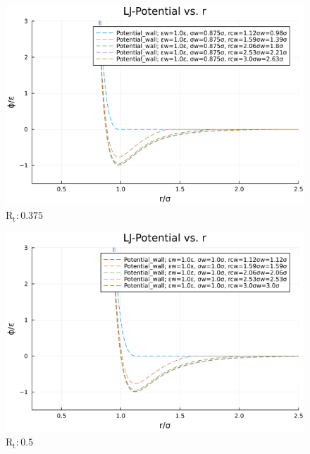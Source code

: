 \begin{figure}[H]
  \centering
  \includegraphics[scale=0.5]{image/RaRtmap_LJ/LJ-Potential_Rt0.375.png}
  \caption{$\text{R}_\text{t}:0.375$}
  \label{}
\end{figure}

\begin{figure}[H]
  \centering
  \includegraphics[scale=0.5]{image/RaRtmap_LJ/LJ-Potential_Rt0.5.png}
  \caption{$\text{R}_\text{t}:0.5$}
  \label{}
\end{figure}
